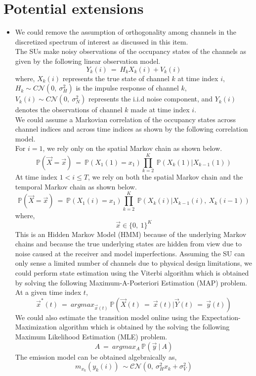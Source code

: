 \documentclass[12pt, draftcls, onecolumn]{IEEEtran}
\begin{document}
\section{Potential extensions}\label{IV} 
\begin{itemize}
    \item We could remove the assumption of orthogonality among channels in the discretized spectrum of interest as discussed in this item.
    \\The SUs make noisy observations of the occupancy states of the channels as given by the following linear observation model.
    \[Y_k(i)\ =\ H_kX_k(i) + V_k(i)\]
    where, $X_k(i)$ represents the true state of channel $k$ at time index $i$, $H_k \sim C\mathcal{N}(0,\ \sigma_H^2)$ is the impulse response of channel $k$, $V_k(i) \sim C\mathcal{N}(0,\ \sigma_N^2)$ represents the i.i.d noise component, and $Y_k(i)$ denotes the observations of channel $k$ made at time index $i$.
    \\We could assume a Markovian correlation of the occupancy states across channel indices and across time indices as shown by the following correlation model.
    \\For $i=1$, we rely only on the spatial Markov chain as shown below.
    \[\mathbb{P}(\Vec{X}=\Vec{x})\ =\ \mathbb{P}(X_1(1) = x_1)\prod_{k=2}^K\ \mathbb{P}(X_k(1)|X_{k-1}(1))\]
    At time index $1 < i \leq T$, we rely on both the spatial Markov chain and the temporal Markov chain as shown below.
    \[\mathbb{P}(\Vec{X}=\Vec{x})\ =\ \mathbb{P}(X_1(i) = x_1)\prod_{k=2}^K\ \mathbb{P}(X_k(i)|X_{k-1}(i),\ X_{k}(i-1))\]
    where,
    \[\Vec{x} \in \{0,\ 1\}^K\]
    This is an Hidden Markov Model (HMM) because of the underlying Markov chains and because the true underlying states are hidden from view due to noise caused at the receiver and model imperfections.
    Assuming the SU can only sense a limited number of channels due to physical design limitations, we could perform state estimation using the Viterbi algorithm which is obtained by solving the following Maximum-A-Posteriori Estimation (MAP) problem.
    At a given time index $t$,
    \[\Vec{x}^*(t)\ =\ argmax_{\Vec{x}(t)}\ \mathbb{P}(\Vec{X}(t)\ =\ \Vec{x}(t)|\Vec{Y}(t)\ =\ \Vec{y}(t))\]
    We could also estimate the transition model online using the Expectation-Maximization algorithm which is obtained by the solving the following Maximum Likelihood Estimation (MLE) problem.
    \[A\ =\ argmax_{A}\ \mathbb{P}(\vec{y}\ |\ A)\]
    The emission model can be obtained algebraically as,
    \[m_{x_k}(y_k(i))\ \sim \mathcal{CN}(0,\ \sigma_{H}^2 x_k + \sigma_{V}^2)\]

\end{itemize}
\end{document}
